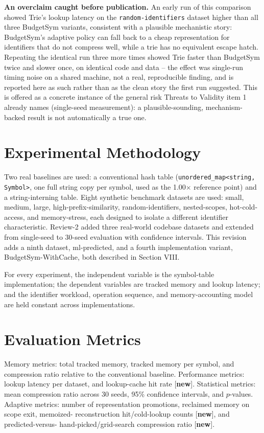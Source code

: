 \documentclass[conference]{IEEEtran}
\begin{document}
\textbf{An overclaim caught before publication.} An early run of this
comparison showed Trie's lookup latency on the \texttt{random-identifiers}
dataset higher than all three BudgetSym variants, consistent with a
plausible mechanistic story: BudgetSym's adaptive policy can fall back to a
cheap representation for identifiers that do not compress well, while a
trie has no equivalent escape hatch. Repeating the identical run three more
times showed Trie faster than BudgetSym twice and slower once, on identical
code and data -- the effect was single-run timing noise on a shared
machine, not a real, reproducible finding, and is reported here as such
rather than as the clean story the first run suggested. This is offered as
a concrete instance of the general risk Threats to Validity item 1 already
names (single-seed measurement): a plausible-sounding, mechanism-backed
result is not automatically a true one.

\section{Experimental Methodology}
Two real baselines are used: a conventional hash table
(\texttt{unordered\_map<string, Symbol>}, one full string copy per symbol,
used as the 1.00$\times$ reference point) and a string-interning table.
Eight synthetic benchmark datasets are used: small, medium, large,
high-prefix-similarity, random-identifiers, nested-scopes, hot-cold-access,
and memory-stress, each designed to isolate a different identifier
characteristic. Review-2 added three real-world codebase datasets and
extended from single-seed to 30-seed evaluation with confidence intervals.
This revision adds a ninth dataset, ml-predicted, and a fourth
implementation variant, BudgetSym-WithCache, both described in Section VIII.

For every experiment, the independent variable is the symbol-table
implementation; the dependent variables are tracked memory and lookup
latency; and the identifier workload, operation sequence, and
memory-accounting model are held constant across implementations.

\section{Evaluation Metrics}
Memory metrics: total tracked memory, tracked memory per symbol, and
compression ratio relative to the conventional baseline. Performance
metrics: lookup latency per dataset, and lookup-cache hit rate
[\textbf{new}]. Statistical metrics: mean compression ratio across 30 seeds,
95\% confidence intervals, and $p$-values. Adaptive metrics: number of
representation promotions, reclaimed memory on scope exit, memoized-
reconstruction hit/cold-lookup counts [\textbf{new}], and predicted-versus-
hand-picked/grid-search compression ratio [\textbf{new}].
\end{document}
